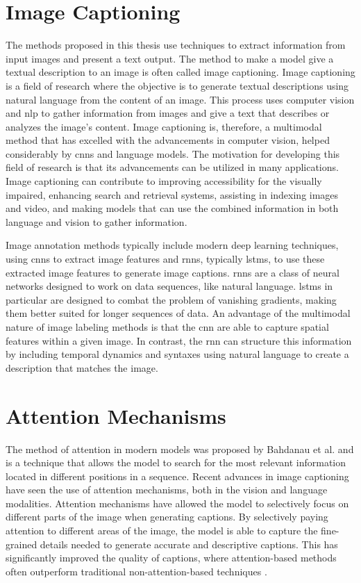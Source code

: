 \section{Image Captioning}

    The methods proposed in this thesis use techniques to extract information from input images and present a text output. The method to make a model give a textual description to an image is often called image captioning.
    Image captioning is a field of research where the objective is to generate textual descriptions using natural language from the content of an image. This process uses computer vision and \gls{nlp} to gather information from images and give a text that describes or analyzes the image's content. Image captioning is, therefore, a multimodal method that has excelled with the advancements in computer vision, helped considerably by \glspl{cnn} and language models. The motivation for developing this field of research is that its advancements can be utilized in many applications. Image captioning can contribute to improving accessibility for the visually impaired, enhancing search and retrieval systems, assisting in indexing images and video, and making models that can use the combined information in both language and vision to gather information. 

    Image annotation methods typically include modern deep learning techniques, using \glspl{cnn} to extract image features and \glspl{rnn}, typically \glspl{lstm}, to use these extracted image features to generate image captions. \glspl{rnn} are a class of neural networks designed to work on data sequences, like natural language. \glspl{lstm} in particular are designed to combat the problem of vanishing gradients, making them better suited for longer sequences of data. An advantage of the multimodal nature of image labeling methods is that the \gls{cnn} are able to capture spatial features within a given image. In contrast, the \gls{rnn} can structure this information by including temporal dynamics and syntaxes using natural language to create a description that matches the image.


    \section{Attention Mechanisms}
    The method of attention in modern models was proposed by Bahdanau et al. \cite{bahdanauNeuralMachineTranslation2016} and is a technique that allows the model to search for the most relevant information located in different positions in a sequence. Recent advances in image captioning have seen the use of attention mechanisms, both in the vision and language modalities. Attention mechanisms have allowed the model to selectively focus on different parts of the image when generating captions. By selectively paying attention to different areas of the image, the model is able to capture the fine-grained details needed to generate accurate and descriptive captions. This has significantly improved the quality of captions, where attention-based methods often outperform traditional non-attention-based techniques \cite{liEntangledTransformerImage2019}. 
    
